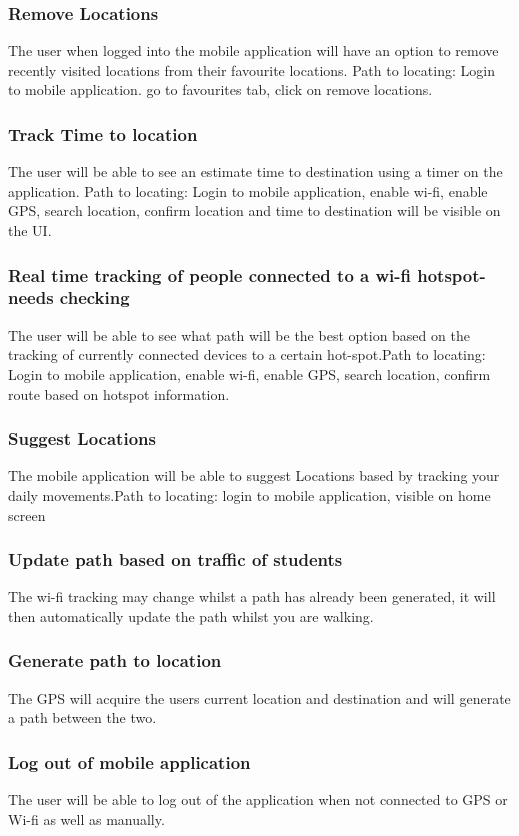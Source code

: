 \documentclass{article}
\begin{document}
\subsubsection{Remove Locations}
The user when logged into the mobile application will have an option to remove recently visited locations from their favourite locations. Path to locating: Login to mobile application. go to favourites tab, click on remove locations.

\subsubsection{Track Time to location}
The user will be able to see an estimate time to destination using a timer on the application. Path to locating: Login to mobile application, enable wi-fi, enable GPS, search location, confirm location and time to destination will be visible on the UI. 
\subsubsection{Real time tracking of people connected to a wi-fi hotspot-needs checking}
The user will be able to see what path will be the best option based on the tracking of currently connected devices to a certain hot-spot.Path to locating: Login to mobile application, enable wi-fi, enable GPS, search location, confirm route based on hotspot information.
\subsubsection{Suggest Locations}
The mobile application will be able to suggest Locations based by tracking your daily movements.Path to locating: login to mobile application, visible on home screen
\subsubsection{Update path based on traffic of students}
The wi-fi tracking may change whilst a path has already been generated, it will then automatically update the path whilst you are walking.
\subsubsection{Generate path to location}
The GPS will acquire the users current location and destination and will generate a path between the two.
\subsubsection{Log out of mobile application}
The user will be able to log out of the application when not connected to GPS or Wi-fi as well as manually.
\end{document}
